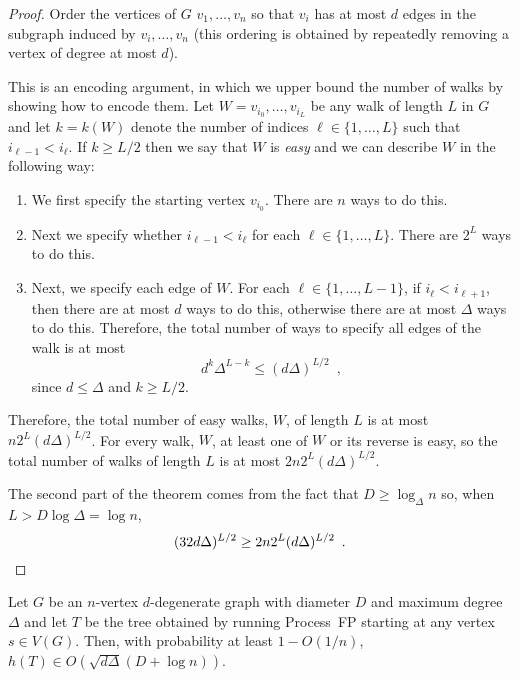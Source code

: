 \documentclass{patmorin}
\begin{document}
\begin{proof}
   Order the vertices of $G$ $v_1,\ldots,v_n$ so that $v_i$ has at most
   $d$ edges in the subgraph induced by $v_i,\ldots,v_n$ (this ordering
   is obtained by repeatedly removing a vertex of degree at most $d$).

   This is an encoding argument, in which we upper bound the number of
   walks by showing how to encode them.  Let $W=v_{i_0},\ldots,v_{i_L}$
   be any walk of length $L$ in $G$ and let $k=k(W)$ denote the number
   of indices $\ell\in\{1,\ldots,L\}$ such that $i_{\ell-1} < i_{\ell}$.
   If $k\ge L/2$ then we say that $W$ is \emph{easy} and we can describe $W$ in the following way:
   \begin{enumerate}
     \item We first specify the starting vertex $v_{i_0}$.  There are $n$
       ways to do this.
     \item Next we specify whether $i_{\ell-1} < i_{\ell}$ for each
       $\ell\in\{1,\ldots,L\}$.  There are $2^L$ ways to do this.
     \item Next, we specify each edge of $W$.  For each
       $\ell\in\{1,\ldots,L-1\}$, if $i_{\ell} < i_{\ell+1}$, then
       there are at most $d$ ways to do this, otherwise there are at
       most $\Delta$ ways to do this.
       Therefore, the total number of ways to specify all edges of the
       walk is at most
       \[   d^k\Delta^{L-k} \le (d\Delta)^{L/2}  \enspace ,\]
       since $d\le \Delta$ and $k\ge L/2$.
   \end{enumerate}
   Therefore, the total number of easy walks, $W$, of length $L$ is at
   most $n2^L(d\Delta)^{L/2}$.  For every walk, $W$, at least one of $W$
   or its reverse is easy, so the total number of walks of length $L$
   is at most $2n2^L(d\Delta)^{L/2}$.

   The second part of the theorem comes from the fact that $D\ge
   \log_\Delta n$ so, when $L>D\log\Delta=\log n$,
   \[ (32d\Delta)^{L/2} \ge 2n2^L(d\Delta)^{L/2} \enspace . \qedhere \]
\end{proof}

\begin{thm}
  Let $G$ be an $n$-vertex $d$-degenerate graph with diameter $D$ and
  maximum degree $\Delta$ and let $T$ be the tree obtained
  by running Process~FP starting at any vertex $s\in V(G)$.  Then,
  with probability at least $1-O(1/n)$, $h(T)\in O(\sqrt{d\Delta}(D+\log n))$.
\end{thm}
\end{document}
